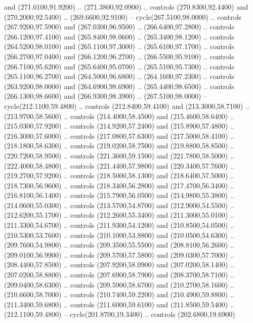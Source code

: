 {\begin{scope}[y=0.80pt, x=0.80pt, yscale=-1, xscale=1, inner sep=0pt, outer sep=0pt, #1]
      and (271.0100,91.9200) .. (271.3800,92.0900) .. controls (270.8300,92.4400)
      and (270.2000,92.5400) .. (269.6600,92.9100) -- cycle(267.5100,98.0000) ..
      controls (267.9200,97.5900) and (267.0300,96.9500) .. (266.6400,97.2800) ..
      controls (266.1200,97.4100) and (265.8400,98.0600) .. (265.3400,98.1200) ..
      controls (264.5200,98.0100) and (265.1100,97.3000) .. (265.6100,97.1700) ..
      controls (266.2700,97.0400) and (266.1200,96.2700) .. (266.5500,95.9100) ..
      controls (266.7100,95.6200) and (265.6400,95.0700) .. (265.5100,95.7300) ..
      controls (265.1100,96.2700) and (264.5000,96.6800) .. (264.1600,97.2300) ..
      controls (263.9200,98.0000) and (264.6900,98.6900) .. (265.4400,98.6500) ..
      controls (266.1300,98.6600) and (266.9300,98.3900) .. (267.5100,98.0000) --
      cycle(212.1100,59.4800) .. controls (212.8400,59.4100) and (213.3000,58.7100)
      .. (213.9700,58.5600) .. controls (214.4000,58.4500) and (215.4600,58.6400) ..
      (215.0300,57.9200) .. controls (214.9200,57.2400) and (215.8900,57.4800) ..
      (216.3000,57.6000) .. controls (217.0800,57.6300) and (217.5000,58.4100) ..
      (218.1800,58.6300) .. controls (219.0200,58.7500) and (219.8800,58.8500) ..
      (220.7200,58.9500) .. controls (221.3600,59.1500) and (221.7800,58.5000) ..
      (222.4000,58.4800) .. controls (221.4400,57.9800) and (220.3400,57.7600) ..
      (219.2700,57.9200) .. controls (218.5000,58.1300) and (218.6400,57.5000) ..
      (218.7300,56.9600) .. controls (218.3400,56.2800) and (217.4700,56.3400) ..
      (216.8100,56.1400) .. controls (215.7900,56.0500) and (214.9800,55.3800) ..
      (214.0600,55.0300) .. controls (213.5700,54.8700) and (212.9000,54.5500) ..
      (212.6200,55.1700) .. controls (212.2600,55.3400) and (211.3000,55.0100) ..
      (211.3300,54.6700) .. controls (211.9300,54.1200) and (210.8500,54.0500) ..
      (210.5300,53.7600) .. controls (210.1000,53.8800) and (210.0500,54.6300) ..
      (209.7600,54.9800) .. controls (209.3500,55.5500) and (208.8100,56.2600) ..
      (209.0100,56.9900) .. controls (209.5700,57.5800) and (209.0300,57.7000) ..
      (208.4400,57.8500) .. controls (207.9200,58.0900) and (207.0200,58.1400) ..
      (207.0200,58.8800) .. controls (207.6900,58.7900) and (208.3700,58.7100) ..
      (209.0400,58.6300) .. controls (209.5900,58.6700) and (210.2700,58.1600) ..
      (210.6600,58.7000) .. controls (210.7400,59.2200) and (210.4900,59.8800) ..
      (211.3400,59.6800) .. controls (211.6000,59.6100) and (211.8500,59.5400) ..
      (212.1100,59.4800) -- cycle(201.8700,19.3400) .. controls (202.6800,19.6900)

\end{scope}}
